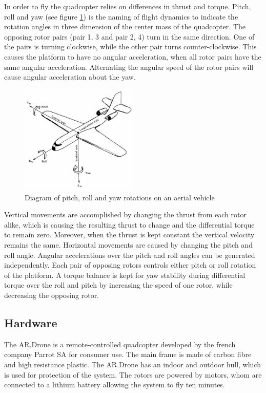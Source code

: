 \documentclass[a4paper]{article}
\begin{document}
In order to fly the quadcopter relies on differences in thrust and torque. Pitch, roll and yaw (see figure \ref{plane}) is the naming of flight dynamics to indicate the rotation angles in three dimension of the center mass of the quadcopter. The opposing rotor pairs (pair 1, 3 and pair 2, 4) turn in the same direction. One of the pairs is turning clockwise, while the other pair turns counter-clockwise. This causes the platform to have no angular acceleration, when all rotor pairs have the same angular acceleration. Alternating the angular speed of the rotor pairs will cause angular acceleration about the yaw.

\begin{figure}[!h]
	\centering
	\includegraphics[width=0.5\textwidth]{images/plane.jpg}
	\caption{Diagram of pitch, roll and yaw rotations on an aerial vehicle}
	\label{plane}
\end{figure}

Vertical movements are accomplished by changing the thrust from each rotor alike, which is causing the resulting thrust to change and the differential torque to remain zero. Moreover, when the thrust is kept constant the vertical velocity remains the same. Horizontal movements are caused by changing the pitch and roll angle. Angular accelerations over the pitch and roll angles can be generated independently. Each pair of opposing rotors controls either pitch or roll rotation of the platform. A torque balance is kept for yaw stability during differential torque over the roll and pitch by increasing the speed of one rotor, while decreasing the opposing rotor.

\subsection{Hardware}
The AR.Drone is a remote-controlled quadcopter developed by the french company Parrot SA for consumer use. The main frame is made of carbon fibre and high resistance plastic. The AR.Drone has an indoor and outdoor hull, which is used for protection of the system. The rotors are powered by motors, whom are connected to a lithium battery allowing the system to fly ten minutes.
\end{document}
